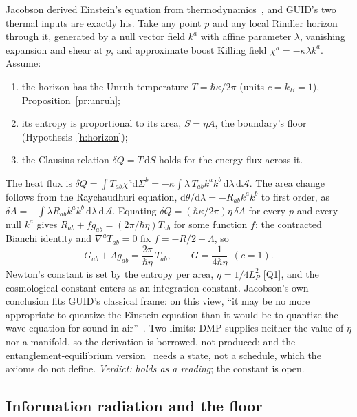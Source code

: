 \documentclass[11pt,a4paper]{article}
\theoremstyle{definition}
\theoremstyle{remark}
\newcommand{\chk}[1]{\textsf{[#1]}}
\newcommand{\dd}{\mathrm{d}}
\theoremstyle{definition}
\begin{document}
Jacobson derived Einstein's equation from thermodynamics~\cite{jacobson95}, and GUID's two thermal inputs are exactly his. Take any point
$p$ and any local Rindler horizon through it, generated by a null vector field $k^a$ with affine parameter $\lambda$, vanishing expansion and
shear at $p$, and approximate boost Killing field $\chi^a=-\kappa\lambda k^a$. Assume:
\begin{enumerate}[nosep]
\item the horizon has the Unruh temperature $T=\hbar\kappa/2\pi$ (units $c=k_B=1$), Proposition~\ref{pr:unruh};
\item its entropy is proportional to its area, $S=\eta A$, the boundary's floor (Hypothesis~\ref{h:horizon});
\item the Clausius relation $\delta Q=T\,\dd S$ holds for the energy flux across it.
\end{enumerate}
The heat flux is $\delta Q=\int T_{ab}\chi^a\dd\Sigma^b=-\kappa\int\lambda\,T_{ab}k^ak^b\,\dd\lambda\,\dd\mathcal A$. The area change follows
from the Raychaudhuri equation, $\dd\theta/\dd\lambda=-R_{ab}k^ak^b$ to first order, as $\delta A=-\int\lambda R_{ab}k^ak^b\,\dd\lambda\,\dd\mathcal A$.
Equating $\delta Q=(\hbar\kappa/2\pi)\eta\,\delta A$ for every $p$ and every null $k^a$ gives
$R_{ab}+f g_{ab}=(2\pi/\hbar\eta)T_{ab}$ for some function $f$; the contracted Bianchi identity and $\nabla^aT_{ab}=0$ fix
$f=-R/2+\Lambda$, so
\begin{equation}\label{eq:jacobson}
G_{ab}+\Lambda g_{ab}=\frac{2\pi}{\hbar\eta}\,T_{ab},\qquad G=\frac{1}{4\hbar\eta}\ \ (c=1).
\end{equation}
Newton's constant is set by the entropy per area, $\eta=1/4L_P^2$ \chk{Q1}, and the cosmological constant enters as an integration
constant. Jacobson's own conclusion fits GUID's classical frame: on this view, ``it may be no more appropriate to quantize the Einstein
equation than it would be to quantize the wave equation for sound in air''~\cite{jacobson95}. Two limits: DMP supplies neither the value of $\eta$ nor
a manifold, so the derivation is borrowed, not produced; and the entanglement-equilibrium version~\cite{jacobson16} needs a state, not a
schedule, which the axioms do not define. \emph{Verdict: holds as a reading}; the constant is open.

\subsection{Information radiation and the floor}
\end{document}
